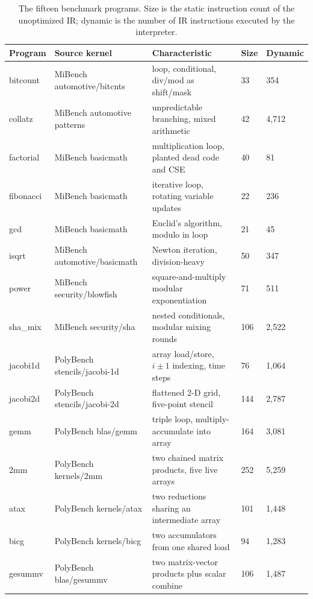 \begin{table}[!htb]
\centering\small
\caption[The fifteen benchmark programs.]{The fifteen benchmark programs. Size is the static instruction count of the unoptimized IR; dynamic is the number of IR instructions executed by the interpreter.}
\label{tab:benchmarks}
\begin{tabular}{L{1.7cm} L{4.2cm} L{4.6cm} C{1.0cm} C{1.4cm}}
\toprule
\textbf{Program} & \textbf{Source kernel} & \textbf{Characteristic} & \textbf{Size} & \textbf{Dynamic}\\
\midrule
bitcount & MiBench automotive/bitcnts & loop, conditional, div/mod as shift/mask & 33 & 354\\
collatz & MiBench automotive patterns & unpredictable branching, mixed arithmetic & 42 & 4{,}712\\
factorial & MiBench basicmath & multiplication loop, planted dead code and CSE & 40 & 81\\
fibonacci & MiBench basicmath & iterative loop, rotating variable updates & 22 & 236\\
gcd & MiBench basicmath & Euclid's algorithm, modulo in loop & 21 & 45\\
isqrt & MiBench automotive/basicmath & Newton iteration, division-heavy & 50 & 347\\
power & MiBench security/blowfish & square-and-multiply modular exponentiation & 71 & 511\\
sha\_mix & MiBench security/sha & nested conditionals, modular mixing rounds & 106 & 2{,}522\\
jacobi1d & PolyBench stencils/jacobi-1d & array load/store, $i\pm1$ indexing, time steps & 76 & 1{,}064\\
jacobi2d & PolyBench stencils/jacobi-2d & flattened 2-D grid, five-point stencil & 144 & 2{,}787\\
gemm & PolyBench blas/gemm & triple loop, multiply-accumulate into array & 164 & 3{,}081\\
2mm & PolyBench kernels/2mm & two chained matrix products, five live arrays & 252 & 5{,}259\\
atax & PolyBench kernels/atax & two reductions sharing an intermediate array & 101 & 1{,}448\\
bicg & PolyBench kernels/bicg & two accumulators from one shared load & 94 & 1{,}283\\
gesummv & PolyBench blas/gesummv & two matrix-vector products plus scalar combine & 106 & 1{,}487\\
\bottomrule
\end{tabular}
\end{table}

